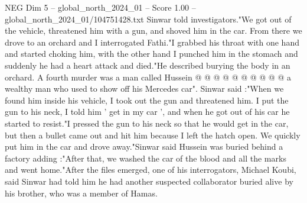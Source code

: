 \begin{textsample}{NEG Dim 5 – global\_north\_2024\_01 – Score 1.00 – global\_north\_2024\_01/104751428.txt}
Sinwar told investigators."We got out of the vehicle, threatened him with a gun, and shoved him in the car.
From there we drove to an orchard and I interrogated Fathi."I grabbed his throat with one hand and started choking him, with the other hand I punched him in the stomach and suddenly he had a heart attack and died."He described burying the body in an orchard.
A fourth murder was a man called Hussein @ @ @ @ @ @ @ @ @ @ a wealthy man who used to show off his Mercedes car".
Sinwar said :"When we found him inside his vehicle, I took out the gun and threatened him.
I put the gun to his neck, I told him ' get in my car ', and when he got out of his car he started to resist."I pressed the gun to his neck so that he would get in the car, but then a bullet came out and hit him because I left the hatch open.
We quickly put him in the car and drove away."Sinwar said Hussein was buried behind a factory adding :"After that, we washed the car of the blood and all the marks and went home."After the files emerged, one of his interrogators, Michael Koubi, said Sinwar had told him he had another suspected collaborator buried alive by his brother, who was a member of Hamas.

\end{textsample}
